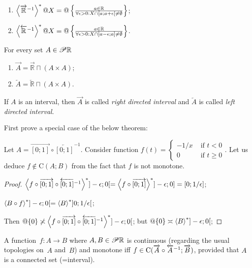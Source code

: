 \begin{xca}~
\begin{enumerate}
\item $\left\langle \overrightarrow{\mathbb{R}}^{-1}\right\rangle ^{\ast}@X = @\left\{ \frac{a\in\mathbb{R}}{\forall\epsilon>0:X\cap[a;a+\epsilon[\ne\emptyset}\right\}$;
\item $\left\langle \overleftarrow{\mathbb{R}}^{-1}\right\rangle ^{\ast}@X = @\left\{ \frac{a\in\mathbb{R}}{\forall\epsilon>0:X\cap]a-\epsilon;a]\ne\emptyset}\right\}$.
\end{enumerate}
\end{xca}

\begin{defn}
For every set $A\in\mathscr{P}\mathbb{R}$
\begin{enumerate}
\item $\overrightarrow{A} = \overrightarrow{\mathbb{R}} \sqcap(A\times A)$;
\item $\overleftarrow{A} = \overleftarrow{\mathbb{R}} \sqcap(A\times A)$.
\end{enumerate}
If $A$ is an interval, then $\overrightarrow{A}$ is called \emph{right directed interval} and $\overleftarrow{A}$ is called \emph{left directed interval}.
\end{defn}

First prove a special case of the below theorem: 

\begin{example}
Let $A = \overrightarrow{[0;1]}\circ\overleftarrow{[0;1]}^{-1}$.
Consider function $f (t) = \begin{cases}
  - 1 / x & \text{ if } t < 0\\
  0 & \text{ if } t \geqslant 0
\end{cases}$. Let us deduce $f \notin \mathrm{C} (A ; B)$ from the
fact that $f$ is not monotone.
\end{example}

\begin{proof}
$\left\langle f\circ\overrightarrow{[0;1]}\circ\overleftarrow{[0;1]}^{-1}\right\rangle ^{\ast} ]-\epsilon;0[ =
\left\langle f\circ\overrightarrow{[0;1]}\right\rangle ^{\ast} ]-\epsilon;0] = [0;1/\epsilon]$;

$\left\langle B\circ f\right\rangle ^{\ast} ]-\epsilon;0[ = \left\langle B\right\rangle ^{\ast} ]0;1/\epsilon[$;

Then $@\{0\}\not\asymp\left\langle f\circ\overrightarrow{[0;1]}\circ\overleftarrow{[0;1]}^{-1}\right\rangle ^{\ast} ]-\epsilon;0[$;
but $@\{0\}\asymp\left\langle B\right\rangle ^{\ast} ]-\epsilon;0[$;
\end{proof}

\begin{thm}
A function~$f:A\rightarrow B$ where $A,B\in\mathscr{P}\mathbb{R}$ is continuous (regarding the usual topologies on~$A$ and~$B$) and monotone iff
$f\in\mathrm{C}(\overrightarrow{A}\circ\overleftarrow{A}^{-1};\overrightarrow{B})$, provided that $A$ is a connected set (=interval).
\end{thm}

